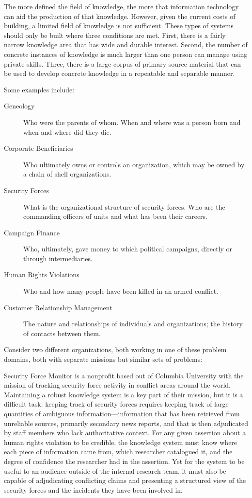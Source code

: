 \documentclass[format=siggraph, review=true]{acmart}
\begin{document}
The more defined the field of knowledge, the more that information
technology can aid the production of that knowledge. However, given
the current costs of building, a limited field of knowledge is not
sufficient. These types of systems should only be built where three
conditions are met. First, there is a fairly narrow knowledge area that
has wide and durable interest. Second, the number of concrete instances
of knowledge is much larger than one person can manage using private
skills. Three, there is a large corpus of primary source material that
can be used to develop concrete knowledge in a repeatable and
separable manner.

Some examples include:

\begin{description}
  \item [Geneology] Who were the parents of whom. When and where was a person
    born and when and where did they die.
  \item [Corporate Beneficiaries] Who ultimately owns or controls an
    organization, which may be owned by a chain of shell organizations.
  \item [Security Forces] What is the organizational structure of
    security forces. Who are the commanding officers of units and
    what has been their careers.
  \item [Campaign Finance] Who, ultimately, gave money to which
    political campaigns, directly or through intermediaries.
  \item [Human Rights Violations] Who and how many people have been
    killed in an armed conflict.
  \item [Customer Relationship Management] The nature and relationships of individuals and organizations; the history of contacts between them. 
\end{description}

Consider two different organizations, both working in one of these problem
domains, both with separate missions but similar sets of problems:

Security Force Monitor is a nonprofit based out of Columbia University
with the mission of tracking security force activity in conflict areas
around the world. Maintaining a robust knowledge system is a key part of
their mission, but it is a difficult task: keeping track of security forces
requires keeping track of large quantities of ambiguous
information—information that has been retrieved from unreliable sources,
primarily secondary news reports, and that is then adjudicated by staff
members who lack authoritative context. For any given assertion about a
human rights violation to be credible, the knowledge system must know
where each piece of information came from, which researcher catalogued it,
and the degree of confidence the researcher had in the assertion. Yet for
the system to be useful to an audience outside of the internal research
team, it must also be capable of adjudicating conflicting claims and
presenting a structured view of the security forces and the incidents
they have been involved in.
\end{document}
